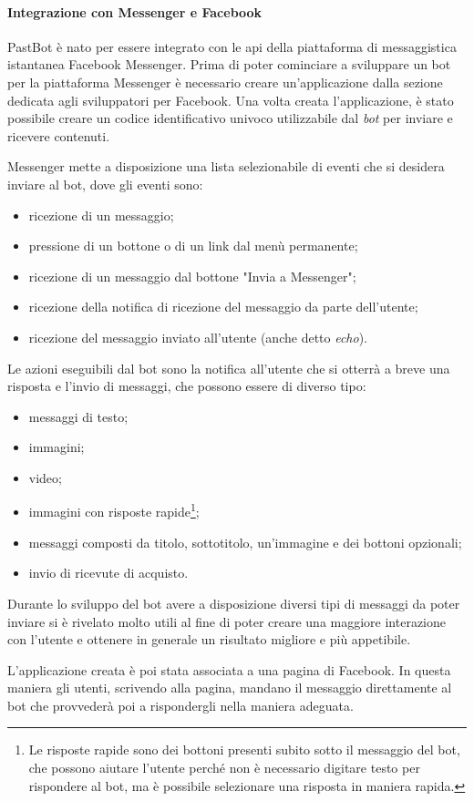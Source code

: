 \paragraph*{Integrazione con Messenger e Facebook}
PastBot è nato per essere integrato con le \gls{api} della piattaforma di
messaggistica istantanea Facebook Messenger.
Prima di poter cominciare a sviluppare un bot per la piattaforma Messenger è
necessario creare un'applicazione dalla sezione dedicata agli sviluppatori per
Facebook.
Una volta creata l'applicazione, è stato possibile creare un codice
identificativo univoco utilizzabile dal \textit{bot} per inviare e ricevere
contenuti.

Messenger mette a disposizione una lista selezionabile di eventi che si desidera
inviare al bot, dove gli eventi sono:
\begin{itemize}
  \item ricezione di un messaggio;
  \item pressione di un bottone o di un link dal menù permanente;
  \item ricezione di un messaggio dal bottone "Invia a Messenger";
  \item ricezione della notifica di ricezione del messaggio da parte
dell'utente;
  \item ricezione del messaggio inviato all'utente (anche detto \textit{echo}).
\end{itemize}

Le azioni eseguibili dal bot sono la notifica all'utente che si otterrà a breve
una risposta e l'invio di messaggi, che possono essere di diverso tipo:
\begin{itemize}
  \item messaggi di testo;
  \item immagini;
  \item video;
  \item immagini con risposte rapide\footnote{Le risposte rapide sono dei
bottoni presenti subito sotto il messaggio del bot, che possono aiutare
l'utente perché non è necessario digitare testo per rispondere al bot, ma è
possibile selezionare una risposta in maniera rapida.};
  \item messaggi composti da titolo, sottotitolo, un'immagine e dei bottoni
opzionali;
  \item invio di ricevute di acquisto.
\end{itemize}

Durante lo sviluppo del bot avere a disposizione diversi tipi di messaggi da
poter inviare si è rivelato molto utili al fine di poter creare una maggiore
interazione con l'utente e ottenere in generale un risultato migliore e più
appetibile.

L'applicazione creata è poi stata associata a una pagina di Facebook. In questa
maniera gli utenti, scrivendo alla pagina, mandano il messaggio direttamente al
bot che provvederà poi a rispondergli nella maniera adeguata.
